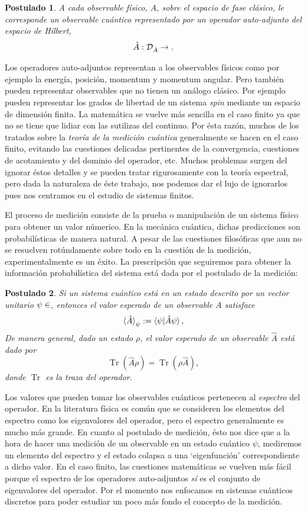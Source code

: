 \documentclass[a4paper]{report}
\let\H\relax
\DeclareMathOperator{\H}{\mathcal H}
\DeclareMathOperator{\Tr}{Tr}
\newtheorem{axiom}{Postulado}
\begin{document}
  \begin{axiom}
    \label{ax:2}
    A cada observable físico, $A$, sobre el espacio de fase
    clásico, le corresponde un observable cuántico
    representado por un operador auto-adjunto del espacio de
    Hilbert, 
    \[
      \hat{A} : \mathcal D_{\hat{A}} \to \H.  
    \]
  \end{axiom}
  Los operadores auto-adjuntos representan a los observables
  físicos como por ejemplo la energía, posición, momentum y
  momentum angular. Pero también pueden representar
  observables que no tienen un análogo clásico. Por ejemplo
  pueden representar los grados de libertad de un sistema
  \textit{spin} mediante un espacio de dimensión finita. La
  matemática se vuelve más sencilla en el caso finito ya que
  no se tiene que lidiar con las sutilizas del continuo. Por
  ésta razón, muchos de los tratados sobre la \textit{teoría
  de la medición cuántica} generalmente se hacen en el caso
  finito, evitando las cuestiones delicadas pertinentes de
  la convergencia, cuestiones de acotamiento y del dominio
  del operador, etc.  Muchos problemas surgen del ignorar
  éstos detalles y se pueden tratar rigurosamente con la
  teoría espectral, pero dada la naturaleza de éste trabajo,
  nos podemos dar el lujo de ignorarlos pues nos centramos
  en el estudio de sistemas finitos. 

  El proceso de medición consiste de la prueba o
  manipulación de un sistema físico para obtener un valor
  númerico. En la mecánica cuántica, dichas predicciones son
  probabilísticas de manera natural. A pesar de las
  cuestiones filosóficas que aun no se resuelven
  rotúndamente sobre todo en la cuestión de la medición,
  experimentalmente es un éxito. La prescripción que
  seguiremos para obtener la información probabilística del
  sistema está dada por el postulado de la medición:
  \begin{axiom}
    \label{ax:3}
    Si un sistema cuántico está en un estado descrito por un
    vector unitario $\psi \in \H$, entonces el valor
    esperado de un observable $A$ satisface
    \[
      \braket{\hat A}_\psi
      := \braket{\psi|\hat A \psi},
    \] 
    De manera general, dado un estado $\rho$, el valor
    esperado de un observable $\hat{A}$ está dado por
    \[
      \Tr\left(\hat{A}\rho\right)
      = \Tr\left( \rho\hat{A} \right),
    \]
    donde $\Tr$ es la traza del operador.
  \end{axiom}
  Los valores que pueden tomar los observables cuánticos
  pertenecen al \textit{espectro} del operador. En la
  literatura física es común que se consideren los elementos
  del espectro como los eigenvalores del operador, pero el
  espectro generalmente es mucho más grande. En cuanto al
  postulado de medición, ésto nos dice que a la hora de
  hacer una medición de un observable en un estado cuántico
  $\psi$, mediremos un elemento del espectro y el estado
  colapsa a una `eigenfunción' correspondiente a dicho
  valor. En el caso finito, las cuestiones matemáticas se
  vuelven más fácil porque el espectro de los operadores
  auto-adjuntos \textit{sí} es el conjunto de eigenvalores
  del operador. Por el momento nos enfocamos en sistemas
  cuánticos discretos para poder estudiar un poco más fondo
  el concepto de la medición.
\end{document}
